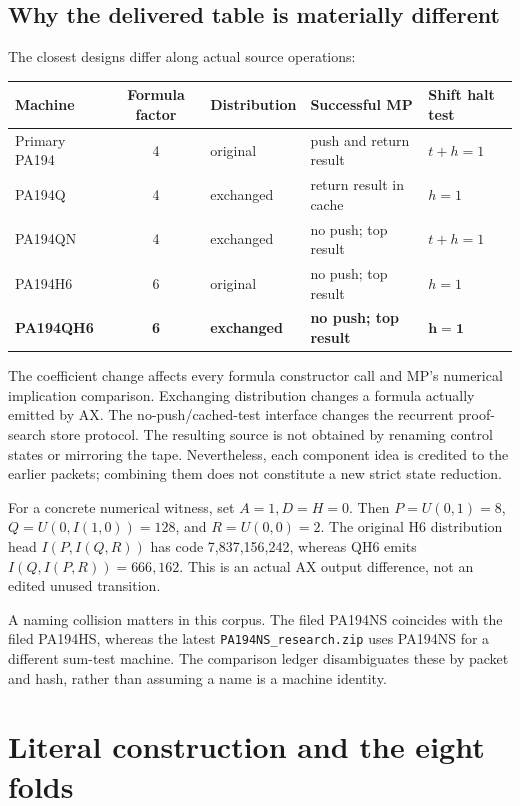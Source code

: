 \documentclass[11pt,letterpaper]{article}
\newcommand{\file}[1]{\texttt{\nolinkurl{#1}}}
\begin{document}
\subsection{Why the delivered table is materially different}

The closest designs differ along actual source operations:
\begin{center}\small
\begin{tabularx}{\textwidth}{@{}lclXX@{}}
\toprule Machine & Formula factor & Distribution & Successful MP & Shift halt test\\\midrule
Primary PA194 & 4 & original & push and return result & \(t+h=1\)\\
PA194Q & 4 & exchanged & return result in cache & \(h=1\)\\
PA194QN & 4 & exchanged & no push; top result & \(t+h=1\)\\
PA194H6 & 6 & original & no push; top result & \(h=1\)\\
\textbf{PA194QH6} & \textbf{6} & \textbf{exchanged} & \textbf{no push; top result} & \(\boldsymbol{h=1}\)\\
\bottomrule
\end{tabularx}
\end{center}

The coefficient change affects every formula constructor call and MP's
numerical implication comparison. Exchanging distribution changes a
formula actually emitted by AX. The no-push/cached-test interface changes
the recurrent proof-search store protocol. The resulting source is not
obtained by renaming control states or mirroring the tape. Nevertheless,
each component idea is credited to the earlier packets; combining them
does not constitute a new strict state reduction.

For a concrete numerical witness, set \(A=1,D=H=0\). Then
\(P=U(0,1)=8\), \(Q=U(0,I(1,0))=128\), and \(R=U(0,0)=2\).
The original H6 distribution head \(I(P,I(Q,R))\) has code
7,837,156,242, whereas QH6 emits \(I(Q,I(P,R))=666,162\).
This is an actual AX output difference, not an edited unused transition.

A naming collision matters in this corpus. The filed PA194NS coincides
with the filed PA194HS, whereas the latest \file{PA194NS_research.zip}
uses PA194NS for a different sum-test machine. The comparison ledger
disambiguates these by packet and hash, rather than assuming a name is a
machine identity.

\section{Literal construction and the eight folds}\label{sec:construction}
\end{document}
